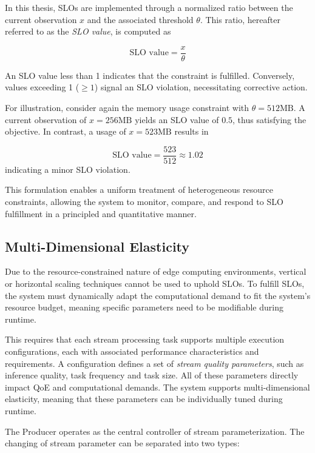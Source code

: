 In this thesis, SLOs are implemented through a normalized ratio between the current observation $x$ and the associated threshold $\theta$. This ratio, hereafter referred to as the \textit{SLO value}, is computed as

\[
\text{SLO value} = \frac{x}{\theta}
\]

An SLO value less than 1 indicates that the constraint is fulfilled. Conversely, values exceeding 1 
(\(\geq1\)) signal an SLO violation, necessitating corrective action.

For illustration, consider again the memory usage constraint with \(\theta = 512\text{MB}\). A current observation of \(x = 256\text{MB}\) yields an SLO value of \(0.5\), thus satisfying the objective. In contrast, a usage of \(x = 523\text{MB}\) results in

\[
\text{SLO value} = \frac{523}{512} \approx 1.02
\]
indicating a minor SLO violation.

This formulation enables a uniform treatment of heterogeneous resource constraints, allowing the system to monitor, compare, and respond to SLO fulfillment in a principled and quantitative manner.

\subsection{Multi-Dimensional Elasticity}
Due to the resource-constrained nature of edge computing environments, vertical or horizontal scaling techniques cannot be used to uphold SLOs. To fulfill SLOs, the system must dynamically adapt the computational demand to fit the system's resource budget, meaning specific parameters need to be modifiable during runtime.

This requires that each stream processing task supports multiple execution configurations, each with associated performance characteristics and requirements. A configuration defines a set of \textit{stream quality parameters}, such as inference quality, task frequency and task size. All of these parameters directly impact QoE and computational demands. The system supports multi-dimensional elasticity, meaning that these parameters can be individually tuned during runtime.

The Producer operates as the central controller of stream parameterization. The changing of stream parameter can be separated into two types:

